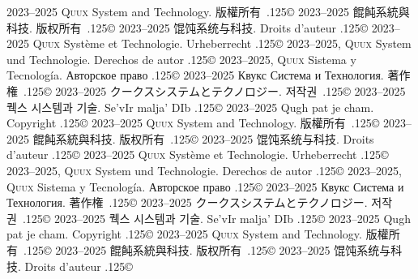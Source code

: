 \documentclass{cookbook}
\begin{document}
	2023--2025 \textsc{Quux} System and Technology.
版權所有~{\lower.125\baselineskip\hbox{\copyright}}
	2023--2025 餛飩系統與科技.
版权所有~{\lower.125\baselineskip\hbox{\copyright}}
	2023--2025 馄饨系统与科技.
Droits d'auteur {\lower.125\baselineskip\hbox{\copyright}} %
	2023--2025 \textsc{Quux} Système et Technologie.
Urheberrecht {\lower.125\baselineskip\hbox{\copyright}} %
	2023--2025, \textsc{Quux} System und Technologie.
Derechos de autor {\lower.125\baselineskip\hbox{\copyright}} %
	2023--2025, \textsc{Quux} Sistema y Tecnología.
\foreignlanguage{russian}{Авторское право} %
	{\lower.125\baselineskip\hbox{\copyright}}
	2023–2025 \foreignlanguage{russian}{Квукс Система и Технология.}
著作権~{\lower.125\baselineskip\hbox{\copyright}}
	2023--2025 クークスシステムとテクノロジー.
저작권~{\lower.125\baselineskip\hbox{\copyright}}
	2023--2025 퀙스 시스템과 기술.
Se'vIr malja' DIb {\lower.125\baselineskip\hbox{\copyright}} %
	2023--2025 Qugh pat je cham.
Copyright {\lower.125\baselineskip\hbox{\copyright}}
	2023--2025 \textsc{Quux} System and Technology.
版權所有~{\lower.125\baselineskip\hbox{\copyright}}
	2023--2025 餛飩系統與科技.
版权所有~{\lower.125\baselineskip\hbox{\copyright}}
	2023--2025 馄饨系统与科技.
Droits d'auteur {\lower.125\baselineskip\hbox{\copyright}} %
	2023--2025 \textsc{Quux} Système et Technologie.
Urheberrecht {\lower.125\baselineskip\hbox{\copyright}} %
	2023--2025, \textsc{Quux} System und Technologie.
Derechos de autor {\lower.125\baselineskip\hbox{\copyright}} %
	2023--2025, \textsc{Quux} Sistema y Tecnología.
\foreignlanguage{russian}{Авторское право} %
	{\lower.125\baselineskip\hbox{\copyright}}
	2023–2025 \foreignlanguage{russian}{Квукс Система и Технология.}
著作権~{\lower.125\baselineskip\hbox{\copyright}}
	2023--2025 クークスシステムとテクノロジー.
저작권~{\lower.125\baselineskip\hbox{\copyright}}
	2023--2025 퀙스 시스템과 기술.
Se'vIr malja' DIb {\lower.125\baselineskip\hbox{\copyright}} %
	2023--2025 Qugh pat je cham.
Copyright {\lower.125\baselineskip\hbox{\copyright}}
	2023--2025 \textsc{Quux} System and Technology.
版權所有~{\lower.125\baselineskip\hbox{\copyright}}
	2023--2025 餛飩系統與科技.
版权所有~{\lower.125\baselineskip\hbox{\copyright}}
	2023--2025 馄饨系统与科技.
Droits d'auteur {\lower.125\baselineskip\hbox{\copyright}} %
\end{document}
